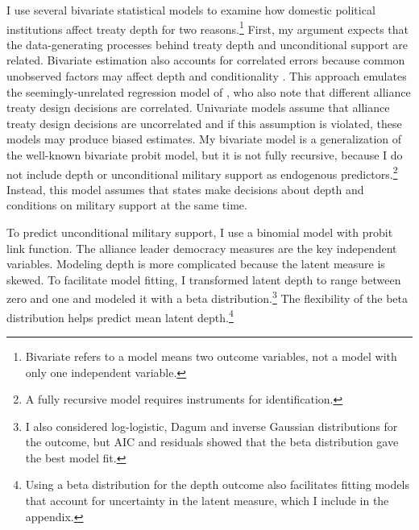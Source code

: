 \documentclass[12pt]{article}
\begin{document}
I use several bivariate statistical models to examine how domestic political institutions affect treaty depth for two reasons.\footnote{Bivariate refers to a model means two outcome variables, not a model with only one independent variable.} 
First, my argument expects that the data-generating processes behind treaty depth and unconditional support are related. 
Bivariate estimation also accounts for correlated errors because common unobserved factors may affect depth and conditionality \citep{Braumoelleretal2018}.
This approach emulates the seemingly-unrelated regression model of \citet{FjelstulReiter2019}, who also note that different alliance treaty design decisions are correlated. 
Univariate models assume that alliance treaty design decisions are uncorrelated and if this assumption is violated, these models may produce biased estimates. 
My bivariate model is a generalization of the well-known bivariate probit model, but it is not fully recursive, because I do not include depth or unconditional military support as endogenous predictors.\footnote{A fully recursive model requires instruments for identification.}  
Instead, this model assumes that states make decisions about depth and conditions on military support at the same time. 


To predict unconditional military support, I use a binomial model with probit link function. 
The alliance leader democracy measures are the key independent variables.
Modeling depth is more complicated because the latent measure is skewed.
To facilitate model fitting, I transformed latent depth to range between zero and one and modeled it with a beta distribution.\footnote{I also considered log-logistic, Dagum and inverse Gaussian distributions for the outcome, but AIC and residuals showed that the beta distribution gave the best model fit.}
The flexibility of the beta distribution helps predict mean latent depth.\footnote{Using a beta distribution for the depth outcome also facilitates fitting models that account for uncertainty in the latent measure, which I include in the appendix.} 
\end{document}
